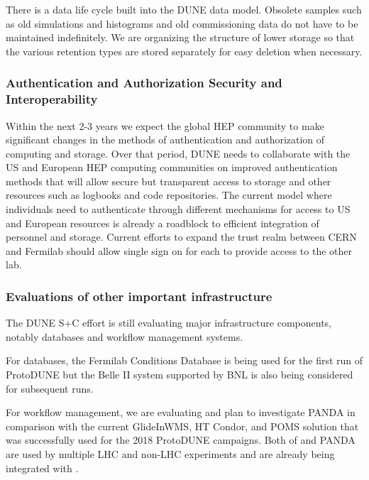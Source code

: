 There is a data life cycle built into the DUNE data model.  Obsolete samples such as old simulations and histograms and old commissioning data do not have to be maintained indefinitely.  
We are organizing the structure of lower storage so that the various retention types are stored separately for easy deletion when necessary.  

\subsubsection{Authentication and Authorization Security and Interoperability}\label{ch-comp-auth}

Within the next 2-3 years we expect the global HEP community to make significant changes in the methods of authentication and authorization of computing and storage. 
Over that period, DUNE needs to collaborate with the US and European HEP computing communities on improved authentication methods  that will allow secure but transparent access to storage and other resources such as logbooks and code repositories.  The current model where individuals need to authenticate through different mechanisms for access to US and European resources is already a roadblock to efficient integration  of personnel and storage. 
Current efforts to expand the trust realm between CERN and Fermilab should allow single sign on for each to provide access to the other lab.








\subsubsection{Evaluations of other important infrastructure}

The DUNE S+C effort is still evaluating major infrastructure components, notably databases and workflow management systems.

For databases\cite{Laycock:2019ynk}, the Fermilab Conditions Database is being used for the first run of ProtoDUNE but the Belle II\cite{Ritter:2018jxh} system supported by BNL is also being considered for subsequent runs. 

For workflow management, we are evaluating \cite{Falabella:2016waj} and plan to investigate PANDA \cite{Megino:2017ywl} in comparison with the current GlideInWMS, HT Condor, and POMS solution that was successfully used for the 2018 ProtoDUNE campaigns.
Both of  and PANDA are used by multiple LHC and non-LHC experiments and are already being integrated with . 


